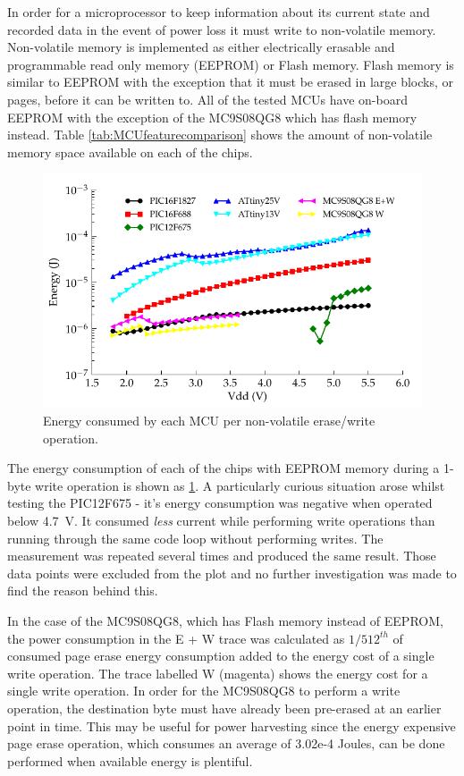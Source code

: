       In order for a microprocessor to keep information about its current state and recorded data in the event of power loss it must write to non-volatile memory.
      Non-volatile memory is implemented as either electrically erasable and programmable read only memory (EEPROM) or Flash memory.
      Flash memory is similar to EEPROM with the exception that it must be erased in large blocks, or pages, before it can be written to.
      All of the tested MCUs have on-board EEPROM with the exception of the MC9S08QG8 which has flash memory instead.
      Table \ref{tab:MCUfeaturecomparison} shows the amount of non-volatile memory space available on each of the chips.

      \begin{figure}
        \centering
        \includegraphics{content/pt1/03-EnergyRequirements/graphics/Graph_All_EEPROM_JPO}
        \caption{\label{fig:Energy-consumed-EEPROM}Energy consumed by each MCU per non-volatile erase/write operation.}
      \end{figure}

      The energy consumption of each of the chips with EEPROM memory during a 1-byte write operation is shown as \cref{fig:Energy-consumed-EEPROM}.
      A particularly curious situation arose whilst testing the PIC12F675 - it's energy consumption was negative when operated below \SI{4.7}{\volt}.
      It consumed \emph{less} current while performing write operations than running through the same code loop without performing writes.
      The measurement was repeated several times and produced the same result.
      Those data points were excluded from the plot and no further investigation was made to find the reason behind this.

      In the case of the MC9S08QG8, which has Flash memory instead of EEPROM, the power consumption in the E + W trace was calculated as $1/512^{th}$ of consumed page erase energy consumption added to the energy cost of a single write operation.
      The trace labelled W (magenta) shows the energy cost for a single write operation.
      In order for the MC9S08QG8 to perform a write operation, the destination byte must have already been pre-erased at an earlier point in time.
      This may be useful for power harvesting since the energy expensive page erase operation, which consumes an average of 3.02e-4 Joules, can be done performed when available energy is plentiful.

